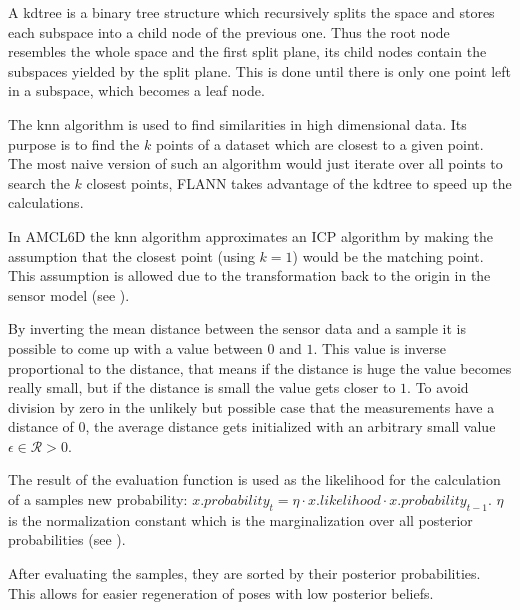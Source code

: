 \documentclass[Thesis.tex]{subfiles}
\begin{document}
A \gls{kdtree} is a binary tree structure which recursively splits the space and stores each subspace into a child node of the previous one. Thus the root node resembles the whole space and the first split plane, its child nodes contain the subspaces yielded by the split plane. This is done until there is only one point left in a subspace, which becomes a leaf node. 

The \gls{knn} algorithm is used to find similarities in high dimensional data\cite[]{flann_pami_2014}. Its purpose is to find the $k$ points of a dataset which are closest to a given point. The most naive version of such an algorithm would just iterate over all points to search the $k$ closest points, \gls{FLANN} takes advantage of the \gls{kdtree} to speed up the calculations. 

In \gls{AMCL6D} the \gls{knn} algorithm approximates an \gls{ICP} algorithm by making the assumption that the closest point (using $k=1$) would be the matching point. This assumption is allowed due to the transformation back to the origin in the sensor model (see ). 

By inverting the mean distance between the sensor data and a sample it is possible to come up with a value between $0$ and $1$. This value is inverse proportional to the distance, that means if the distance is huge the value becomes really small, but if the distance is small the value gets closer to $1$. To avoid division by zero in the unlikely but possible case that the measurements have a distance of $0$, the average distance gets initialized with an arbitrary small value $\epsilon \in \mathcal{R} > 0$.

The result of the evaluation function is used as the likelihood for the calculation of a samples new probability: $x.probability_t = \eta \cdot x.likelihood \cdot x.probability_{t-1}$. $\eta$ is the normalization constant which is the marginalization over all posterior probabilities (see ).

\smallskip

After evaluating the samples, they are sorted by their posterior probabilities. This allows for easier regeneration of poses with low posterior beliefs.
\end{document}
